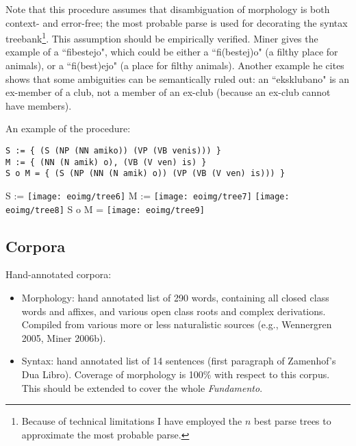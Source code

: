 \documentclass[10pt,a4paper]{article}
\begin{document}
Note that this procedure assumes that disambiguation of morphology is both
context- and error-free; the most probable parse is used for decorating the
syntax treebank\footnote{Because of technical limitations I have employed the
$n$ best parse trees to approximate the most probable parse.}. This assumption
should be empirically verified. Miner gives the example of a ``fibestejo", which
could be either a ``fi(bestej)o" (a filthy place for animals), or a ``fi(best)ejo"
(a place for filthy animals).  Another example he cites shows that some
ambiguities can be semantically ruled out: an ``eksklubano" is an ex-member of
a club, not a member of an ex-club (because an ex-club cannot have members).

An example of the procedure:

\begin{verbatim}
S := { (S (NP (NN amiko)) (VP (VB venis))) } 
M := { (NN (N amik) o), (VB (V ven) is) }
S o M = { (S (NP (NN (N amik) o)) (VP (VB (V ven) is))) }
\end{verbatim}
S := %
\texttt{[image: eoimg/tree6]}
M := %
\texttt{[image: eoimg/tree7]}
\texttt{[image: eoimg/tree8]}
S o M = %
\texttt{[image: eoimg/tree9]}

\subsection{Corpora}

Hand-annotated corpora:

\begin{itemize}

\item Morphology: hand annotated list of 290 words, containing all closed class
      words and affixes, and various open class roots and complex derivations.
      Compiled from various more or less naturalistic sources (e.g., Wennergren 2005,
      Miner 2006b).

\item Syntax: hand annotated list of 14 sentences (first paragraph of
      Zamenhof's Dua Libro). Coverage of morphology is 100\% with respect to
      this corpus. This should be extended to cover the whole {\em Fundamento}.

\end{itemize}
\end{document}
